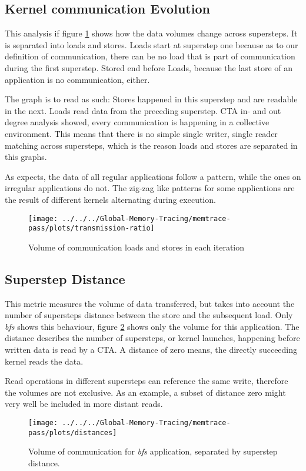 \subsection{Kernel communication Evolution}
This analysis if figure \ref{trans-ratio} shows how the data volumes change across supersteps. It is separated into loads and stores. Loads start at superstep one because as to our definition of communication, there can be no load that is part
of communication during the first superstep. Stored end before Loads, because the last store of an application is no communication, either.

The graph is to read as such: Stores happened in this superstep and are readable in the next. Loads read data from the preceding superstep. CTA in- and out degree analysis showed, every communication is happening in a collective environment. This means that there is no simple single writer, single reader matching across supersteps, which is the reason loads and stores are separated in this graphs.

As expects, the data of all regular applications follow a pattern, while the ones on irregular applications do not. The zig-zag like patterns for some applications are the result of different kernels alternating during execution.
\begin{figure}[h!]
	\centering
	\texttt{[image: ../../../Global-Memory-Tracing/memtrace-pass/plots/transmission-ratio]}
	\caption{Volume of communication loads and stores in each iteration}
	\label{trans-ratio}
\end{figure}
\subsection{Superstep Distance}
This metric measures the volume of data transferred, but takes into account the number of supersteps distance between the store and the subsequent load. Only \textit{bfs} shows this behaviour,
figure \ref{trans-distance} shows only the volume for this application. The distance describes the number
of supersteps, or kernel launches, happening before written data is read by a CTA. A distance of zero means, the directly succeeding kernel reads the data.

Read operations in different supersteps can reference the same write, therefore the volumes are not exclusive.
As an example, a subset of distance zero might very well be included in more distant reads.
\begin{figure}[t]
	\centering
	\texttt{[image: ../../../Global-Memory-Tracing/memtrace-pass/plots/distances]}
	\caption{Volume of communication for \textit{bfs} application, separated by superstep distance.}
	\label{trans-distance}
\end{figure}
